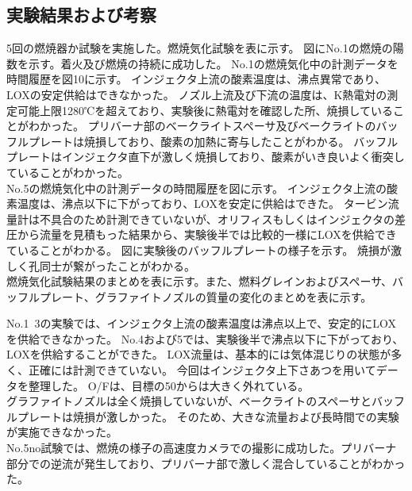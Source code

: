 \subsection{実験結果および考察}
5回の燃焼器か試験を実施した。燃焼気化試験を表に示す。
図にNo.1の燃焼の陽数を示す。着火及び燃焼の持続に成功した。
No.1の燃焼気化中の計測データを時間履歴を図10に示す。
インジェクタ上流の酸素温度は、沸点異常であり、LOXの安定供給はできなかった。
ノズル上流及び下流の温度は、K熱電対の測定可能上限1280℃を超えており、実験後に熱電対を確認した所、焼損していることがわかった。
プリバーナ部のベークライトスペーサ及びベークライトのバッフルプレートは焼損しており、酸素の加熱に寄与したことがわかる。
バッフルプレートはインジェクタ直下が激しく焼損しており、酸素がいき良いよく衝突していることがわかった。
\\
No.5の燃焼気化中の計測データの時間履歴を図に示す。
インジェクタ上流の酸素温度は、沸点以下に下がっており、LOXを安定に供給はできた。
タービン流量計は不具合のため計測できていないが、オリフィスもしくはインジェクタの差圧から流量を見積もった結果から、実験後半では比較的一様にLOXを供給できていることがわかる。
図に実験後のバッフルプレートの様子を示す。
焼損が激しく孔同士が繋がったことがわかる。
\\
燃焼気化試験結果のまとめを表に示す。また、燃料グレインおよびスペーサ、バッフルプレート、グラファイトノズルの質量の変化のまとめを表に示す。

No.1~3の実験では、インジェクタ上流の酸素温度は沸点以上で、安定的にLOXを供給できなかった。
No.4および5では、実験後半で沸点以下に下がっており、LOXを供給することができた。
LOX流量は、基本的には気体混じりの状態が多く、正確には計測できていない。
今回はインジェクタ上下さあつを用いてデータを整理した。
O/Fは、目標の50からは大きく外れている。
\\
グラファイトノズルは全く焼損していないが、ベークライトのスペーサとバッフルプレートは焼損が激しかった。
そのため、大きな流量および長時間での実験が実施できなかった。
\\
No.5no試験では、燃焼の様子の高速度カメラでの撮影に成功した。プリバーナ部分での逆流が発生しており、プリバーナ部で激しく混合していることがわかった。
\\

